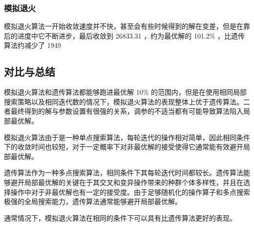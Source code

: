 \subsubsection{模拟退火}
模拟退火算法一开始收敛速度并不快，甚至会有些时候得到的解在变差，但是在靠后的进度中它不断进步，最后收敛到 26833.31 ，约为最优解的 101.2\% ，比遗传算法约减少了 1949 


\subsection{对比与总结}

模拟退火算法和遗传算法都能够跑进最优解 10\% 的范围内，但是在使用相同局部搜索策略以及相同迭代数的情况下，模拟退火算法的表现整体上优于遗传算法。二者最终得到的解与参数设置有很强的关系，调参的不适当都有可能导致算法陷入局部最优解。

模拟退火算法由于是一种单点搜索算法，每轮迭代的操作相对简单，因此相同条件下的收敛时间也较短，对于一定概率下对非最优解的接受使得它通常能有效避开局部最优解。

遗传算法作为一种多点搜索算法，相同条件下其每轮迭代时间都较长。遗传算法能够避开局部最优解的关键在于其交叉和变异操作带来的种群个体多样性，并且在选择操作中对于非最优解也有一定的接受度。由于足够随机化的操作算子和多点搜索极强的全局搜索能力，遗传算法通常能够避开局部最优解。

通常情况下，模拟退火算法在相同的条件下可以具有比遗传算法更好的表现。

